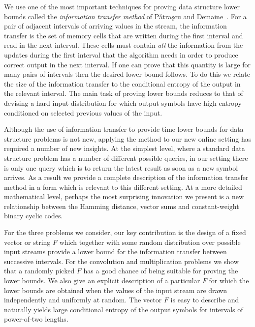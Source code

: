 \documentclass{toc}
\newcommand{\Patrascu}{P{\v a}tra{\c s}cu\xspace}
\begin{document}
We use one of the most important techniques for proving data structure lower bounds called the \emph{information transfer method} of \Patrascu and Demaine~\cite{PD2004:Partial-sums,PD2006:Low-Bounds}.
For a pair of adjacent intervals of arriving values in the stream, the information transfer is the set
of memory cells that are written during the first interval and read in
the next interval. These cells must contain \emph{all} the
information from
the updates during the first interval that the algorithm needs in order 
to produce correct
%
%
output  %
in the next interval. If
one can prove that this quantity is large for many pairs of intervals
then the desired lower
%
bound follows.   %
To do this we relate the size
of the information transfer to the conditional entropy of the
%
output  %
in the relevant interval. The main task of proving lower bounds
reduces to that of devising a hard input distribution for which output symbols
have high entropy conditioned on selected previous values of the input.

Although the use of information transfer to provide time lower bounds for data structure problems is not new,  applying the method to our new online setting has required a number of new insights. At the simplest level, where a standard data structure problem has a number of different possible queries, in our setting there is only one query which is to return the latest result as soon as a  new symbol arrives. As a result we provide a complete description of the information transfer method in a form which is relevant to this different setting.  At a more detailed mathematical level, perhaps the most surprising innovation we present is a new relationship between the Hamming distance, vector sums and
%
constant-weight   %
binary cyclic codes.

For the three problems we consider, our key contribution is the design of a fixed vector or string $F$ 
which together with some random distribution over possible input streams provide a lower bound for the information transfer between successive intervals.
For the convolution and multiplication problems we show that a randomly picked $F$ has a good chance of being suitable for proving the lower bounds. We also give an explicit description of a particular $F$ for which the lower bounds are obtained when the values of the input stream are drawn independently and uniformly at random. The vector $F$ is easy to describe and naturally yields large conditional entropy of the output symbols for intervals of power-of-two lengths.
\end{document}
